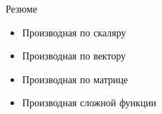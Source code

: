 \documentclass[12pt]{beamer}
\begin{document}
\begin{frame}{Резюме}
\begin{itemize}
\item Производная по скаляру
\item Производная по вектору
\item Производная по матрице
\item Производная сложной функции
\end{itemize}
\end{frame}
\end{document}
